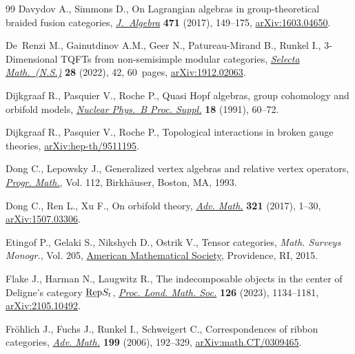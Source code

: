 \documentclass[10pt,a4paper]{amsart}
\numberwithin{equation}{section}
\begin{document}
\begin{thebibliography}{99}
Davydov A., Simmons D., On {L}agrangian algebras in group-theoretical braided
 fusion categories, \href{https://doi.org/10.1016/j.jalgebra.2016.09.016}{\textit{J.~Algebra}} \textbf{471} (2017), 149--175,
 \href{https://arxiv.org/abs/1603.04650}{arXiv:1603.04650}.

De~Renzi M., Gainutdinov A.M., Geer N., Patureau-Mirand B., Runkel I.,
 3-{D}imensional {TQFT}s from non-semisimple modular categories,
 \href{https://doi.org/10.1007/s00029-021-00737-z}{\textit{Selecta Math.~(N.S.)}} \textbf{28} (2022), 42, 60~pages,
 \href{https://arxiv.org/abs/1912.02063}{arXiv:1912.02063}.

Dijkgraaf R., Pasquier V., Roche P., Quasi {H}opf algebras, group cohomology
 and orbifold models, \href{https://doi.org/10.1016/0920-5632(91)90123-V}{\textit{Nuclear Phys.~B Proc. Suppl.}} \textbf{18}
 (1991), 60--72.

Dijkgraaf R., Pasquier V., Roche P., Topological interactions in broken gauge
 theories, \href{https://arxiv.org/abs/hep-th/9511195}{arXiv:hep-th/9511195}.

Dong C., Lepowsky J., Generalized vertex algebras and relative vertex
 operators, \href{https://doi.org/10.1007/978-1-4612-0353-7}{\textit{Progr. Math.}}, Vol. 112, Birkh\"{a}user, Boston, MA, 1993.

Dong C., Ren L., Xu F., On orbifold theory, \href{https://doi.org/10.1016/j.aim.2017.09.032}{\textit{Adv. Math.}} \textbf{321}
 (2017), 1--30, \href{https://arxiv.org/abs/1507.03306}{arXiv:1507.03306}.

Etingof P., Gelaki S., Nikshych D., Ostrik V., Tensor categories, \textit{Math.
 Surveys Monogr.}, Vol. 205, \href{https://doi.org/10.1090/surv/205}{American Mathematical Society}, Providence, RI,
 2015.

Flake J., Harman N., Laugwitz R., The indecomposable objects in the center of
 {D}eligne's category {$\underline{\rm Re}{\rm p}S_t$}, \href{https://doi.org/10.1112/plms.12509}{\textit{Proc. Lond.
 Math. Soc.}} \textbf{126} (2023), 1134--1181, \href{https://arxiv.org/abs/2105.10492}{arXiv:2105.10492}.

Fr\"ohlich J., Fuchs J., Runkel I., Schweigert C., Correspondences of ribbon
 categories, \href{https://doi.org/10.1016/j.aim.2005.04.007}{\textit{Adv. Math.}} \textbf{199} (2006), 192--329,
 \href{https://arxiv.org/abs/math.CT/0309465}{arXiv:math.CT/0309465}.


\end{thebibliography}
\end{document}
